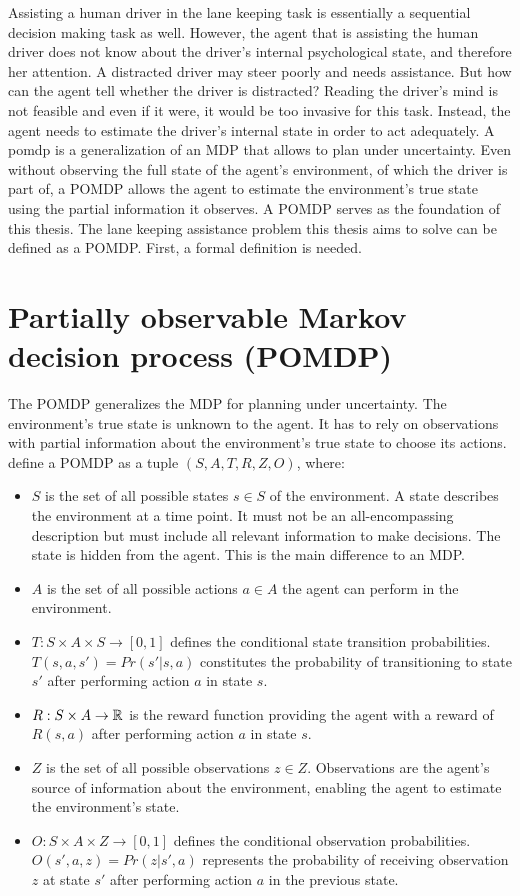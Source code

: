 Assisting a human driver in the lane keeping task is essentially a sequential decision making task as well. However, the agent that is assisting the human driver does not know about the driver's internal psychological state, and therefore her attention. A distracted driver may steer poorly and needs assistance. But how can the agent tell whether the driver is distracted? Reading the driver's mind is not feasible and even if it were, it would be too invasive for this task. Instead, the agent needs to estimate the driver's internal state in order to act adequately. A \Gls{pomdp} is a generalization of an MDP that allows to plan under uncertainty. Even without observing the full state of the agent's environment, of which the driver is part of, a POMDP allows the agent to estimate the environment's true state using the partial information it observes. A POMDP serves as the foundation of this thesis. The lane keeping assistance problem this thesis aims to solve can be defined as a POMDP. First, a formal definition is needed.

\section{Partially observable Markov decision process (POMDP)}
\label{def:pomdp}

The POMDP generalizes the MDP for planning under uncertainty. The environment's true state is unknown to the agent. It has to rely on observations with partial information about the environment's true state to choose its actions. \cite{pomdp-definition} define a POMDP as a tuple $(S, A, T, R, Z, O)$, where:
\begin{itemize}
    \item $S$ is the set of all possible states $s \in S$ of the environment. A state describes the environment at a time point. It must not be an all-encompassing description but must include all relevant information to make decisions. The state is hidden from the agent. This is the main difference to an MDP.
    \item $A$ is the set of all possible actions $a \in A$ the agent can perform in the environment.
    \item $T : S \times A \times S \rightarrow [0,1]$ defines the conditional state transition probabilities. $T(s,a,s') = Pr(s' | s, a)$ constitutes the probability of transitioning to state $s'$ after performing action $a$ in state $s$.
    \item $R : S \times A \rightarrow \mathbb{R}$ is the reward function providing the agent with a reward of $R(s,a)$ after performing action $a$ in state $s$.
    \item $Z$ is the set of all possible observations $z \in Z$. Observations are the agent's source of information about the environment, enabling the agent to estimate the environment's state.
    \item $O : S \times A \times Z \rightarrow [0,1]$ defines the conditional observation probabilities. $O(s', a, z) = Pr(z | s', a)$ represents the probability of receiving observation $z$ at state $s'$ after performing action $a$ in the previous state. 
\end{itemize}

